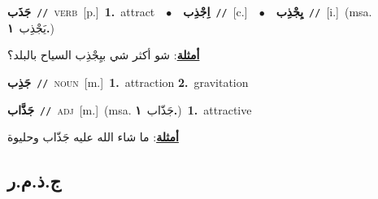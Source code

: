 \documentclass[10pt,a4paper,twoside]{article} %
\begin{document}
\begin{multicols}{2}
{\setlength\topsep{0pt}\textbf{\foreignlanguage{arabic}{جَذَب}}\ {\color{gray}\texttt{//}\color{black}}\ \textsc{verb}\ [p.]\ \textbf{1.}~attract\ \ $\bullet$\ \ \setlength\topsep{0pt}\textbf{\foreignlanguage{arabic}{اِجْذِب}}\ {\color{gray}\texttt{//}\color{black}}\ [c.]\ \ $\bullet$\ \ \setlength\topsep{0pt}\textbf{\foreignlanguage{arabic}{يِجْذِب}}\ {\color{gray}\texttt{//}\color{black}}\ [i.]\ \color{gray}(msa. \foreignlanguage{arabic}{يَجْذِب}~\foreignlanguage{arabic}{\textbf{١.}})\color{black}\  \begin{flushright}\color{gray}\foreignlanguage{arabic}{\textbf{\underline{\foreignlanguage{arabic}{أمثلة}}}: شو أكثر شي بيِجْذِب السياح بالبلد؟}\end{flushright}\color{black}} \vspace{2mm}

{\setlength\topsep{0pt}\textbf{\foreignlanguage{arabic}{جَذِب}}\ {\color{gray}\texttt{//}\color{black}}\ \textsc{noun}\ [m.]\ \textbf{1.}~attraction  \textbf{2.}~gravitation\ } \vspace{2mm}

{\setlength\topsep{0pt}\textbf{\foreignlanguage{arabic}{جَذَّاب}}\ {\color{gray}\texttt{//}\color{black}}\ \textsc{adj}\ [m.]\ \color{gray}(msa. \foreignlanguage{arabic}{جَذّاب}~\foreignlanguage{arabic}{\textbf{١.}})\color{black}\ \textbf{1.}~attractive\  \begin{flushright}\color{gray}\foreignlanguage{arabic}{\textbf{\underline{\foreignlanguage{arabic}{أمثلة}}}: ما شاء الله عليه جَذّاب وحليوة}\end{flushright}\color{black}} \vspace{2mm}

\vspace{-3mm}
\subsection*{\color{blue}\foreignlanguage{arabic}{ج.ذ.م.ر}\color{blue}{}} 


\end{multicols}
\end{document}
